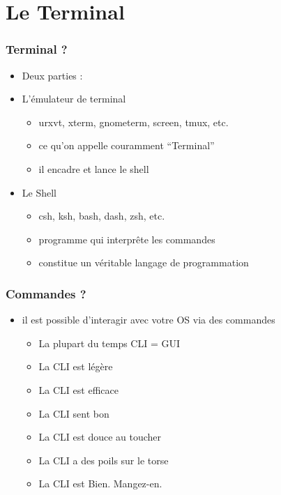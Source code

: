 \section{Le Terminal} 
\begin{frame}
        \frametitle{Terminal ?}
	\begin{itemize}
	    \item Deux parties :
	\end{itemize}
\end{frame}

\begin{frame}
	\begin{itemize}
		\item<1 -> L'émulateur de terminal
			\begin{itemize}
			    \item urxvt, xterm, gnometerm, screen, tmux, etc.
                \item ce qu'on appelle couramment ``Terminal''
                \item il encadre et lance le shell
			\end{itemize}
	    \item<2 -> Le Shell
            \begin{itemize}
                \item csh, ksh, bash, dash, zsh, etc.
                \item programme qui interprête les commandes
                \item constitue un véritable langage de programmation
	    \end{itemize}
	\end{itemize}
\end{frame}
\begin{frame}
    \frametitle{Commandes ?}
    \begin{itemize}
        \item il est possible d'interagir avec votre OS via des commandes
            \begin{itemize}
                \item<1 -> La plupart du temps CLI = GUI
                \item<2 -> La CLI est légère
                \item<3 -> La CLI est efficace
                \item<4 -> La CLI sent bon
                \item<5 -> La CLI est douce au toucher
                \item<6 -> La CLI a des poils sur le torse
                \item<7 -> La CLI est Bien. Mangez-en.
            \end{itemize}
    \end{itemize}
\end{frame}
